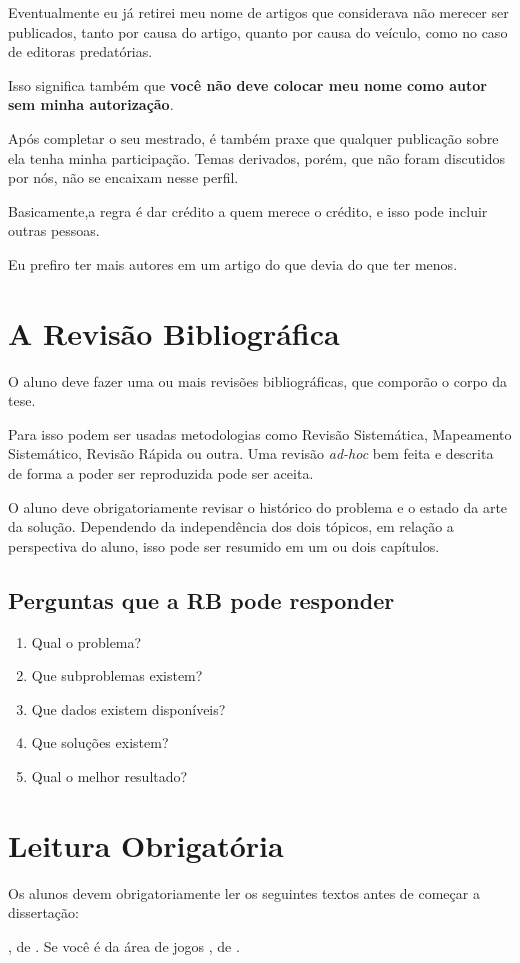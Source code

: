 \documentclass[a4paper,12pt]{report}
\newcommand{\listalivro}[1]{\citetitle{#1}, de \citet{#1}.}
\begin{document}
Eventualmente eu já retirei meu nome de artigos que considerava não merecer ser publicados, tanto por causa do artigo, quanto por causa do veículo, como no caso de editoras predatórias.

Isso significa também que \textbf{você não deve colocar meu nome como autor sem minha autorização}.

Após completar o seu mestrado, é também praxe que qualquer publicação sobre ela tenha minha participação.
Temas derivados, porém, que não foram discutidos por nós, não se encaixam nesse perfil.

Basicamente,a regra é dar crédito a quem merece o crédito, e isso pode incluir outras pessoas.

Eu prefiro ter mais autores em um artigo do que devia do que ter menos.

\chapter{A Revisão Bibliográfica}

O aluno deve fazer uma ou mais revisões bibliográficas, que comporão o corpo da tese.

Para isso podem ser usadas metodologias como Revisão Sistemática, Mapeamento Sistemático, Revisão Rápida ou outra. Uma revisão \textit{ad-hoc} bem feita e descrita de forma a poder ser reproduzida pode ser aceita.

O aluno deve obrigatoriamente revisar o histórico do problema e o estado da arte da solução. Dependendo da independência dos dois tópicos, em relação a perspectiva do aluno, isso pode ser resumido em um ou dois capítulos.

\section{Perguntas que a RB pode responder}
\begin{enumerate}
    \item Qual o problema?
    \item Que subproblemas existem?
    \item Que dados existem disponíveis?
    \item Que soluções existem?
    \item Qual o melhor resultado?
\end{enumerate}

\chapter{Leitura Obrigatória}

Os alunos devem obrigatoriamente ler os seguintes textos antes de começar a dissertação:
\begin{outline}
\1 \listalivro{Dresch:2015}
\1 Se você é da área de jogos
\2 \listalivro{Xexeo:2017}
\end{outline}


\printbibliography
\end{document}

